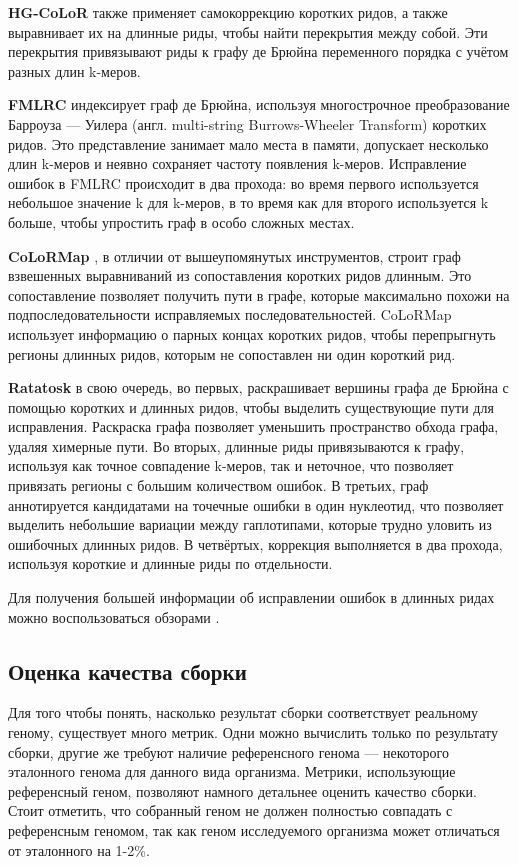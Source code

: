 \documentclass[14pt]{matmex-diploma-custom}
\begin{document}
\textbf{HG-CoLoR} \cite{art:morisse2018hybrid} также применяет самокоррекцию коротких ридов, а также выравнивает их на длинные риды, чтобы найти перекрытия между собой. Эти перекрытия привязывают риды к графу де Брюйна переменного порядка с учётом разных длин k-меров.

\textbf{FMLRC} \cite{art:wang2018fmlrc} индексирует граф де Брюйна, используя многострочное преобразование Барроуза — Уилера (англ. multi-string Burrows-Wheeler Transform) коротких ридов. Это представление занимает мало места в памяти, допускает несколько длин k-меров и неявно сохраняет частоту появления k-меров. Исправление ошибок в FMLRC происходит в два прохода: во время первого используется небольшое значение k для k-меров, в то время как для второго используется k больше, чтобы упростить граф в особо сложных местах.

\textbf{CoLoRMap} \cite{art:haghshenas2016colormap}, в отличии от вышеупомянутых инструментов, строит граф взвешенных выравниваний из сопоставления коротких ридов длинным. Это сопоставление позволяет получить пути в графе, которые максимально похожи на подпоследовательности исправляемых последовательностей. CoLoRMap использует информацию о парных концах коротких ридов, чтобы перепрыгнуть регионы длинных ридов, которым не сопоставлен ни один короткий рид.

\textbf{Ratatosk} \cite{art:holley2021ratatosk} в свою очередь, во первых, раскрашивает вершины графа де Брюйна с помощью коротких и длинных ридов, чтобы выделить существующие пути для исправления. Раскраска графа позволяет уменьшить пространство обхода графа, удаляя химерные пути.
Во вторых, длинные риды привязываются к графу, используя как точное совпадение k-меров, так и неточное, что позволяет привязать регионы с большим количеством ошибок. В третьих, граф аннотируется кандидатами на точечные ошибки в один нуклеотид, что позволяет выделить небольшие вариации между гаплотипами, которые трудно уловить из ошибочных длинных ридов. В четвёртых, коррекция выполняется в два прохода, используя короткие и длинные риды по отдельности.

Для получения большей информации об исправлении ошибок в длинных ридах можно воспользоваться обзорами \cite{art:morisse2020long, art:zook2016extensive, art:zhang2020comprehensive}.

\subsection{Оценка качества сборки}
Для того чтобы понять, насколько результат сборки соответствует реальному геному, существует много метрик. Одни можно вычислить только по результату сборки, другие же требуют наличие референсного генома --- некоторого эталонного генома для данного вида организма. Метрики, использующие референсный геном, позволяют намного детальнее оценить качество сборки. Стоит отметить, что собранный геном не должен полностью совпадать с референсным геномом, так как геном исследуемого организма может отличаться от эталонного на 1-2\%.
\end{document}
